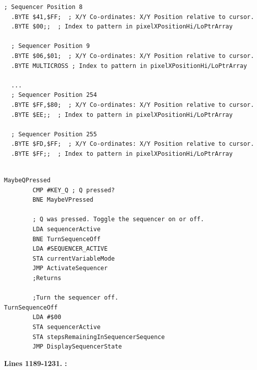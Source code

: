 \begin{lstlisting}[basicstyle=\ttfamily\scriptsize,caption=Sequencer definition in \icode{sequencer\_data.asm}.]
  ; Sequencer Position 8
  .BYTE $41,$FF;  ; X/Y Co-ordinates: X/Y Position relative to cursor.   
  .BYTE $00;;  ; Index to pattern in pixelXPositionHi/LoPtrArray   

  ; Sequencer Position 9
  .BYTE $06,$01;  ; X/Y Co-ordinates: X/Y Position relative to cursor.   
  .BYTE MULTICROSS ; Index to pattern in pixelXPositionHi/LoPtrArray   

  ...
  ; Sequencer Position 254
  .BYTE $FF,$80;  ; X/Y Co-ordinates: X/Y Position relative to cursor.   
  .BYTE $EE;;  ; Index to pattern in pixelXPositionHi/LoPtrArray   

  ; Sequencer Position 255
  .BYTE $FD,$FF;  ; X/Y Co-ordinates: X/Y Position relative to cursor.   
  .BYTE $FF;;  ; Index to pattern in pixelXPositionHi/LoPtrArray   
    
\end{lstlisting}

\clearpage
\begin{lstlisting}
MaybeQPressed    
        CMP #KEY_Q ; Q pressed?
        BNE MaybeVPressed

        ; Q was pressed. Toggle the sequencer on or off.
        LDA sequencerActive
        BNE TurnSequenceOff
        LDA #SEQUENCER_ACTIVE
        STA currentVariableMode
        JMP ActivateSequencer
        ;Returns

        ;Turn the sequencer off.
TurnSequenceOff   
        LDA #$00
        STA sequencerActive
        STA stepsRemainingInSequencerSequence
        JMP DisplaySequencerState
\end{lstlisting}
\clearpage

\textbf{Lines 1189-1231. :} 
\clearpage

